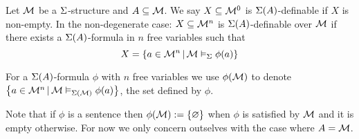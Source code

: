 \begin{dfn}[Definable]
    Let $\mathcal{M}$ be a $\Sigma$-structure and $A \subseteq \mathcal{M}$.
    We say $X \subseteq \mathcal{M}^0$ is $\Sigma(A)$-definable if $X$ is non-empty.
    In the non-degenerate case:
    $X \subseteq {\mathcal{M}}^n$ is $\Sigma(A)$-definable over $\mathcal{M}$ if there exists a 
    $\Sigma(A)$-formula in $n$ free variables such that 
    \[X = \left\{a \in {\mathcal{M}}^n \,|\, \mathcal{M} \vDash_{\Sigma} \phi(a)\right\}\]

    For a $\Sigma(A)$-formula $\phi$ with $n$ free variables we use $\phi(\mathcal{M})$ 
    to denote $\left\{a \in \mathcal{M}^n \,|\, \mathcal{M} \vDash_{\Sigma(\mathcal{M})} \phi(a)\right\}$,
    the set defined by $\phi$.
    
    Note that if $\phi$ is a sentence then 
    $\phi(\mathcal{M}) := \left\{\varnothing\right\}$ when $\phi$ is 
    satisfied by $\mathcal{M}$ and it is empty otherwise.
    For now we only concern outselves with the case where $A = \mathcal{M}$.
\end{dfn}

